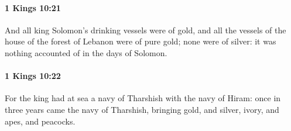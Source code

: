 		\paragraph{1 Kings 10:21} %
			\label{1KINGS-10-21}

			And all king Solomon’s drinking vessels were of gold, and all the vessels of the house of the forest of Lebanon were of pure gold; none were of silver: it was nothing accounted of in the days of Solomon.


		\paragraph{1 Kings 10:22} %
			\label{1KINGS-10-22}

			For the king had at sea a navy of Tharshish with the navy of Hiram: once in three years came the navy of Tharshish, bringing gold, and silver, ivory, and apes, and peacocks.

